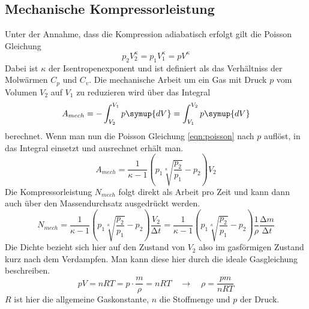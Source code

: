 \subsection{Mechanische Kompressorleistung}
Unter der Annahme, dass die Kompression adiabatisch erfolgt gilt die Poisson Gleichung
\begin{equation}
\label{eqn:poisson}
p_{2}V_{2}^{\kappa} = p_{1}V_{1}^{\kappa} = pV^{\kappa}
\end{equation}
Dabei ist $\kappa$ der Isentropenexponent und ist definiert als das Verhältniss der Molwärmen $C_{p}$ und $C_{v}$.
Die mechanische Arbeit um ein Gas mit Druck $p$ vom Volumen $V_{2}$ auf $V_{1}$ zu reduzieren wird über das Integral
\begin{equation}
A_{mech} = - \int_{V_{2}}^{V_{1}} p \symup{dV} = \int_{V_{1}}^{V_{2}} p \symup{dV}
\end{equation}
berechnet. Wenn man nun die Poisson Gleichung \eqref{eqn:poisson} nach $p$ auflöst, in das Integral einsetzt und ausrechnet erhält man.
\begin{equation}
A_{mech} = \frac{1}{\kappa - 1} \left( p_{1}\sqrt[\kappa]{\frac{p_{2}}{p_{1}}} - p_{2} \right) V_{2}
\end{equation}
Die Kompressorleistung $N_{mech}$ folgt direkt als Arbeit pro Zeit und kann dann auch über den Massendurchsatz ausgedrückt werden.
\begin{equation}
N_{mech} = \frac{1}{\kappa - 1} \left( p_{1}\sqrt[\kappa]{\frac{p_{2}}{p_{1}}} - p_{2} \right) \frac{V_{2}}{\increment t} = \frac{1}{\kappa - 1} \left( p_{1}\sqrt[\kappa]{\frac{p_{2}}{p_{1}}} - p_{2} \right) \frac{1}{\rho} \frac{\increment m}{\increment t}
\end{equation}
Die Dichte bezieht sich hier auf den Zustand von $V_{2}$ also im gasförmigen Zustand kurz nach dem Verdampfen. Man kann diese hier
durch die ideale Gasgleichung beschreiben.
\begin{equation}
p V = nRT = p \cdot \frac{m}{\rho} = nRT \quad \to \quad \rho = \frac{pm}{nRT}
\end{equation}
$R$ ist hier die allgemeine Gaskonstante, $n$ die Stoffmenge und $p$ der Druck.
